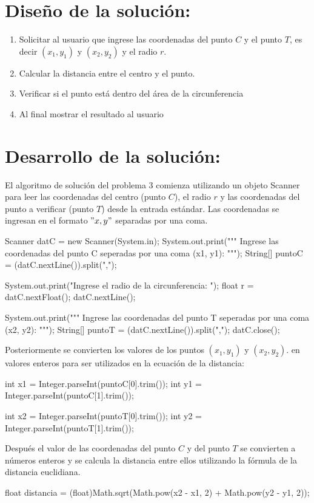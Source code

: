 \documentclass{IEEEcsmag}
\begin{document}
\section*{Diseño de la solución:}
\begin{enumerate} 
\item Solicitar al usuario que ingrese las coordenadas del punto $C$ y el punto $T$, es decir $(x_{1}, y_{1})$ y $(x_{2}, y_{2})$ y el radio $r$.
\item Calcular la distancia entre el centro y el punto.
\item Verificar si el punto está dentro del área de la circunferencia
\item Al final mostrar el resultado al usuario 
\end{enumerate}


\section*{Desarrollo de la solución:}
El algoritmo de solución del problema 3 comienza utilizando un objeto Scanner para leer las coordenadas del centro (punto $C$), el radio $r$ y las coordenadas del punto a verificar (punto $T$) desde la entrada estándar. Las coordenadas se ingresan en el formato $"x, y"$ separadas por una coma.
\begin{javaCode}
Scanner datC = new Scanner(System.in);
        System.out.print("""
                         Ingrese las coordenadas del punto C 
                         seperadas por una coma (x1, y1):
                         """);
    String[] puntoC = (datC.nextLine()).split(",");
        
    System.out.print("Ingrese el radio de la circunferencia: ");
    float r = datC.nextFloat();
    datC.nextLine();
    
    System.out.print("""
                         Ingrese las coordenadas del punto T
                         seperadas por una coma (x2, y2): 
                         """);
    String[] puntoT = (datC.nextLine()).split(",");
    datC.close();
\end{javaCode}
Posteriormente se convierten los valores de los puntos $(x_{1}, y_{1})$ y $(x_{2}, y_{2})$. en valores enteros para ser utilizados  en la ecuación de la distancia:

\begin{javacode}
    int x1 = Integer.parseInt(puntoC[0].trim());
    int y1 = Integer.parseInt(puntoC[1].trim());
        
    int x2 = Integer.parseInt(puntoT[0].trim());
    int y2 = Integer.parseInt(puntoT[1].trim()); 
\end{javacode}
Después el valor de las coordenadas del punto $C$ y del punto $T$ se convierten a números enteros y se calcula la distancia entre ellos utilizando la fórmula de la distancia euclidiana.
\begin{javacode}
float distancia = (float)Math.sqrt(Math.pow(x2 - x1, 2) + Math.pow(y2 - y1, 2)); 
\end{javacode}
\end{document}
